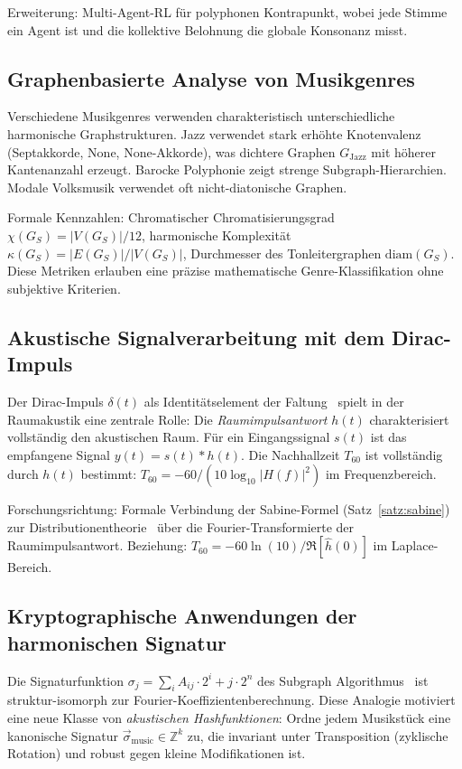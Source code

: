 ﻿\documentclass[a4paper,12pt]{article}
\theoremstyle{definition}
\begin{document}
Erweiterung: Multi-Agent-RL für polyphonen Kontrapunkt, wobei jede Stimme ein
Agent ist und die kollektive Belohnung die globale Konsonanz misst.

\subsection{Graphenbasierte Analyse von Musikgenres}

Verschiedene Musikgenres verwenden charakteristisch unterschiedliche harmonische
Graphstrukturen. Jazz verwendet stark erhöhte Knotenvalenz (Septakkorde, None,
None-Akkorde), was dichtere Graphen $G_{\mathrm{Jazz}}$ mit höherer Kantenanzahl
erzeugt. Barocke Polyphonie zeigt strenge Subgraph-Hierarchien. Modale
Volksmusik verwendet oft nicht-diatonische Graphen.

Formale Kennzahlen: Chromatischer Chromatisierungsgrad $\chi(G_S) = |V(G_S)|/12$,
harmonische Komplexität $\kappa(G_S) = |E(G_S)|/|V(G_S)|$, Durchmesser des
Tonleitergraphen $\mathrm{diam}(G_S)$. Diese Metriken erlauben eine präzise
mathematische Genre-Klassifikation ohne subjektive Kriterien.

\subsection{Akustische Signalverarbeitung mit dem Dirac-Impuls}

Der Dirac-Impuls $\delta(t)$ als Identitätselement der Faltung~\cite{epp2026dirac}
spielt in der Raumakustik eine zentrale Rolle: Die \emph{Raumimpulsantwort}
$h(t)$ charakterisiert vollständig den akustischen Raum. Für ein Eingangssignal
$s(t)$ ist das empfangene Signal $y(t) = s(t) * h(t)$. Die Nachhallzeit $T_{60}$
ist vollständig durch $h(t)$ bestimmt: $T_{60} = -60/(10\log_{10}|H(f)|^2)$ im
Frequenzbereich.

Forschungsrichtung: Formale Verbindung der Sabine-Formel (Satz~\ref{satz:sabine})
zur Distributionentheorie~\cite{epp2026dirac} über die Fourier-Transformierte der
Raumimpulsantwort. Beziehung: $T_{60} = -60\ln(10) / \Re[\hat{h}(0)]$ im Laplace-Bereich.

\subsection{Kryptographische Anwendungen der harmonischen Signatur}

Die Signaturfunktion $\sigma_j = \sum_i A_{ij} \cdot 2^i + j \cdot 2^n$ des
Subgraph Algorithmus~\cite{epp2026subgraph} ist struktur-isomorph zur
Fourier-Koeffizientenberechnung. Diese Analogie motiviert eine neue
Klasse von \emph{akustischen Hashfunktionen}: Ordne jedem Musikstück
eine kanonische Signatur $\vec{\sigma}_{\mathrm{music}} \in \mathbb{Z}^k$ zu, die
invariant unter Transposition (zyklische Rotation) und robust gegen kleine
Modifikationen ist.
\end{document}
